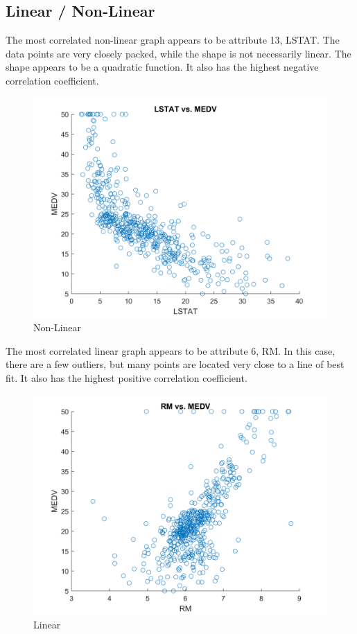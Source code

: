 \documentclass[12pt, letterpaper]{report}
\begin{document}
\subsection{Linear / Non-Linear}

The most correlated non-linear graph appears to be attribute 13, LSTAT. The data points are very closely packed, while the shape is not necessarily linear. The shape appears to be a quadratic function. It also has the highest negative correlation coefficient.

\begin{figure}[H]
	\centering
	\includegraphics[width=0.7\columnwidth]{p1c13.png}
	\caption{Non-Linear}
\end{figure}

The most correlated linear graph appears to be attribute 6, RM.  In this case, there are a few outliers, but many points are located very close to a line of best fit. It also has the highest positive correlation coefficient.

\begin{figure}[H]
\centering
\includegraphics[width=0.7\columnwidth]{p1c6.png}
\caption{Linear}
\end{figure}
\end{document}
